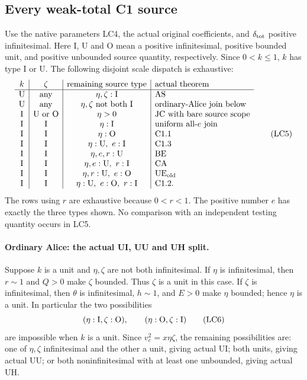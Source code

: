 \subsection{Every weak-total C1 source}

Use the native parameters LC4, the actual original coefficients, and
\(\delta_{\rm tot}\) positive infinitesimal.
Here I, U and O mean a positive infinitesimal, positive bounded unit,
and positive unbounded source quantity, respectively.
Since \(0<k\leq1\), \(k\) has type I or U.
The following disjoint scale dispatch is exhaustive:
\[
\begin{array}{c|c|c|l}
k&\zeta&\text{remaining source type}&\text{actual theorem}\\ \hline
{\rm U}&\text{any}&\eta,\zeta:{\rm I}&{\rm AS}\\
{\rm U}&\text{any}&\eta,\zeta\text{ not both I}&
                      \text{ordinary-Alice join below}\\
{\rm I}&{\rm U\ or\ O}&\eta>0&
                      {\rm JC}\text{ with bare source scope}\\
{\rm I}&{\rm I}&\eta:{\rm I}&
                      \text{uniform all-}e\text{ join}\\
{\rm I}&{\rm I}&\eta:{\rm O}&{\rm C1.1}\\
{\rm I}&{\rm I}&\eta:{\rm U},\ e:{\rm I}&{\rm C1.3}\\
{\rm I}&{\rm I}&\eta,e,r:{\rm U}&{\rm BE}\\
{\rm I}&{\rm I}&\eta,e:{\rm U},\ r:{\rm I}&{\rm CA}\\
{\rm I}&{\rm I}&\eta,r:{\rm U},\ e:{\rm O}&{\rm UE}_{\rm old}\\
{\rm I}&{\rm I}&\eta:{\rm U},\ e:{\rm O},\ r:{\rm I}
                                                  &{\rm C1.2}.
\end{array}\tag{LC5}
\]
The rows using \(r\) are exhaustive because \(0<r<1\).
The positive number \(e\) has exactly the three types shown.
No comparison with an independent testing quantity occurs in LC5.

\paragraph{Ordinary Alice: the actual UI, UU and UH split.}
Suppose \(k\) is a unit and \(\eta,\zeta\) are not both infinitesimal.
If \(\eta\) is infinitesimal, then \(r\sim1\) and \(Q>0\)
make \(\zeta\) bounded.  Thus \(\zeta\) is a unit in this case.
If \(\zeta\) is infinitesimal, then \(\theta\) is infinitesimal,
\(h\sim1\), and \(E>0\) make \(\eta\) bounded; hence \(\eta\)
is a unit.  In particular the two possibilities
\[
 (\eta:{\rm I},\zeta:{\rm O}),\qquad
 (\eta:{\rm O},\zeta:{\rm I})
\tag{LC6}
\]
are impossible when \(k\) is a unit.
Since \(v_c^2=x\eta\zeta\), the remaining possibilities are:
one of \(\eta,\zeta\) infinitesimal and the other a unit, giving
actual UI; both units, giving actual UU; or both noninfinitesimal
with at least one unbounded, giving actual UH.

